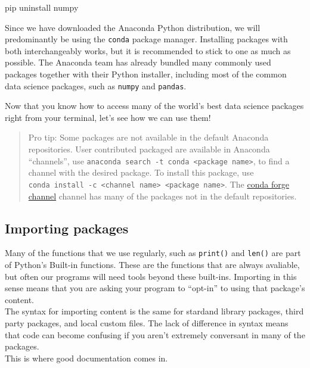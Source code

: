 \documentclass[]{Nemilov}
\newenvironment{Shaded}{\begin{snugshade}}{\end{snugshade}}
\newcommand{\ExtensionTok}[1]{#1}
\newcommand{\NormalTok}[1]{#1}
\begin{document}
\begin{Shaded}
\begin{Highlighting}[]
\ExtensionTok{pip}\NormalTok{ uninstall numpy}
\end{Highlighting}
\end{Shaded}

Since we have downloaded the Anaconda Python distribution, we will
predominantly be using the \texttt{conda} package manager. Installing packages with
both interchangeably works, but it is recommended to stick to one as much as
possible. The Anaconda team has already bundled many commonly used packages
together with their Python installer, including most of the common data science
packages, such as \texttt{numpy} and \texttt{pandas}.

Now that you know how to access many of the world's best data science
packages right from your terminal, let's see how we can use them!

\begin{quote}
Pro tip: Some packages are not available in the default Anaconda repositories. User
contributed packaged are available in Anaconda ``channels'', use \texttt{anaconda\ search\ -t\ conda\ \textless{}package\ name\textgreater{}}, to find a channel with the desired package.
To install this package, use \texttt{conda\ install\ -c\ \textless{}channel\ name\textgreater{}\ \textless{}package\ name\textgreater{}}. The \href{https://conda-forge.github.io/}{conda forge channel} channel
has many of the packages not in the default repositories.
\end{quote}

\hypertarget{py-dev-importing-packages}{%
\subsection{Importing packages}\label{py-dev-importing-packages}}

Many of the functions that we use regularly, such as \texttt{print()} and \texttt{len()} are
part of Python's Built-in functions. These are the functions that are always avaliable,
but often our programs will need tools beyond these built-ins. Importing in this
sense means that you are asking your program to ``opt-in'' to using that package's content.\\
The syntax for importing content is the same for stardand library packages, third
party packages, and local custom files. The lack of difference in syntax means that
code can become confusing if you aren't extremely conversant in many of the packages.\\
This is where good documentation comes in.
\end{document}
